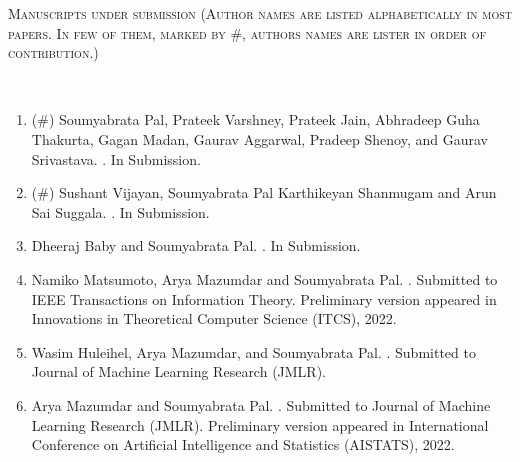 \documentclass[9pt]{article}
\newenvironment{changemargin}[2]{%
  \begin{list}{}{%
    \setlength{\topsep}{0pt}%
    \setlength{\leftmargin}{0pt}%
    \setlength{\rightmargin}{#2}%
    \setlength{\listparindent}{\parindent}%
    \setlength{\itemindent}{\parindent}%
    \setlength{\parsep}{\parskip}%
  }%
  \item[]}{\end{list}
}
\newcommand{\lineover}{
	\begin{changemargin}{-0.05in}{-0.05in}
		\vspace*{-8pt}
		\hrulefill \\
		\vspace*{-2pt}
	\end{changemargin}
}
\newcommand{\header}[1]{
	\begin{changemargin}{-0.5in}{-0.5in}
		\scshape{#1}\\
  	\lineover
	\end{changemargin}
}
\begin{document}
\smallskip
\header{Manuscripts under submission (Author names are listed alphabetically in most papers. In few of them, marked by \#, authors names are lister in order of contribution.)}
\begin{enumerate}



\item (\#) Soumyabrata Pal, Prateek Varshney, Prateek Jain, Abhradeep Guha Thakurta, Gagan Madan, Gaurav Aggarwal, Pradeep Shenoy, and Gaurav Srivastava. \href{https://arxiv.org/abs/2210.03505}{}. In Submission.


\item (\#) Sushant Vijayan, Soumyabrata Pal Karthikeyan Shanmugam and Arun Sai Suggala. \href{}{}.
In Submission.



\item Dheeraj Baby and Soumyabrata Pal. \href{}{}.
In Submission. 


\item Namiko Matsumoto, Arya Mazumdar and Soumyabrata Pal.  \href{https://arxiv.org/abs/2210.16657}{ }. Submitted to IEEE Transactions on Information Theory. Preliminary version appeared in Innovations in Theoretical Computer Science (ITCS), 2022.



\item Wasim Huleihel, Arya Mazumdar, and Soumyabrata Pal. \href{https://arxiv.org/abs/2110.00744}{}. Submitted to Journal of Machine Learning Research (JMLR). 

\item Arya Mazumdar and Soumyabrata Pal. \href{https://arxiv.org/abs/2202.11940}{}. Submitted to Journal of Machine Learning Research (JMLR). Preliminary version appeared in International Conference on Artificial Intelligence and Statistics (AISTATS), 2022.




\end{enumerate}
\end{document}
